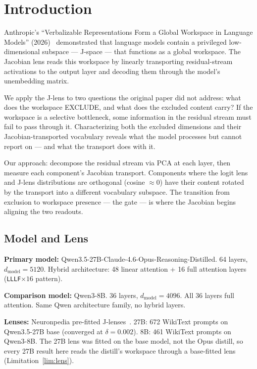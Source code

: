 \documentclass[11pt,a4paper]{article}
\begin{document}
\section{Introduction}

Anthropic's ``Verbalizable Representations Form a Global Workspace in Language Models'' (2026)~\cite{anthropic2026} demonstrated that language models contain a privileged low-dimensional subspace --- J-space --- that functions as a global workspace. The Jacobian lens reads this workspace by linearly transporting residual-stream activations to the output layer and decoding them through the model's unembedding matrix.

We apply the J-lens to two questions the original paper did not address: what does the workspace EXCLUDE, and what does the excluded content carry? If the workspace is a selective bottleneck, some information in the residual stream must fail to pass through it. Characterizing both the excluded dimensions and their Jacobian-transported vocabulary reveals what the model processes but cannot report on --- and what the transport does with it.

Our approach: decompose the residual stream via PCA at each layer, then measure each component's Jacobian transport. Components where the logit lens and J-lens distributions are orthogonal (cosine $\approx 0$) have their content rotated by the transport into a different vocabulary subspace. The transition from exclusion to workspace presence --- the gate --- is where the Jacobian begins aligning the two readouts.

\subsection{Model and Lens}

\textbf{Primary model:} Qwen3.5-27B-Claude-4.6-Opus-Reasoning-Distilled. 64 layers, $d_{\text{model}} = 5120$. Hybrid architecture: 48 linear attention + 16 full attention layers (\texttt{LLLF}${\times}16$ pattern).

\textbf{Comparison model:} Qwen3-8B. 36 layers, $d_{\text{model}} = 4096$. All 36 layers full attention. Same Qwen architecture family, no hybrid layers.

\textbf{Lenses:} Neuronpedia pre-fitted J-lenses~\cite{neuronpedia2026}. 27B: 672 WikiText prompts on Qwen3.5-27B base (converged at $\delta = 0.002$). 8B: 461 WikiText prompts on Qwen3-8B. The 27B lens was fitted on the base model, not the Opus distill, so every 27B result here reads the distill's workspace through a base-fitted lens (Limitation~\ref{lim:lens}).
\end{document}
